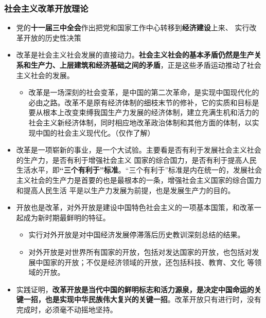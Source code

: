 \documentclass[12pt,openany]{ctexbook}
\begin{document}
\subsubsection{社会主义改革开放理论}
\begin{itemize}
  \item 党的\textbf{十一届三中全会}作出把党和国家工作中心转移到\textbf{经济建设}上来、 实行改革开放的历史性决策
  \item 改革是社会主义社会发展的直接动力。\textbf{社会主义社会的基本矛盾仍然是生产关系和生产力、上层建筑和经济基础之间的矛盾}，正是这些矛盾运动推动了社会主义社会的发展。
\begin{itemize}
  \item 改革是一场深刻的社会变革，是中国的第二次革命，是实现中国现代化的必由之路。改革不是原有经济体制的细枝末节的修补，它的实质和目标是要从根本上改变束缚我国生产力发展的经济体制，建立充满生机和活力的社会主义新经济体制，同时相应地改革政治体制和其他方面的体制，以实现中国的社会主义现代化。（仅作了解）
\end{itemize}
  \item 改革是一项崭新的事业，是一个大试验。主要看是否有利于发展社会主义社会的生产力，是否有利于增强社会主义 国家的综合国力，是否有利于提高人民生活水平，即\textbf{“三个有利于”标准}。“三个有利于”标准是内在统一的，发展社会主义社会的生产力是首要的也是最根本的一条，增强社会主义国家的综合国力和提高人民生活 平是以生产力发展为前提，也是发展生产力的目的。
  \item 开放也是改革，对外开放是建设中国特色社会主义的一项基本国策，和改革一起成为新时期最鲜明的特征。
\begin{itemize}
  \item 实行对外开放是对中国经济发展停滞落后历史教训深刻总结的结果。
  \item 对外开放是对世界所有国家的开放，包括对发达国家的开放，也包括对发展中国家的开放；不仅是经济领域的开放，还包括科技、教育、文化 等领域的开放。
\end{itemize}
  \item 实践证明，\textbf{改革开放是当代中国的鲜明标志和活力源泉，是决定中国命运的关键一招，也是实现中华民族伟大复兴的关键一招}。改革开放只有进行时，没有完成时，必须毫不动摇地坚持。
\end{itemize}
\end{document}
